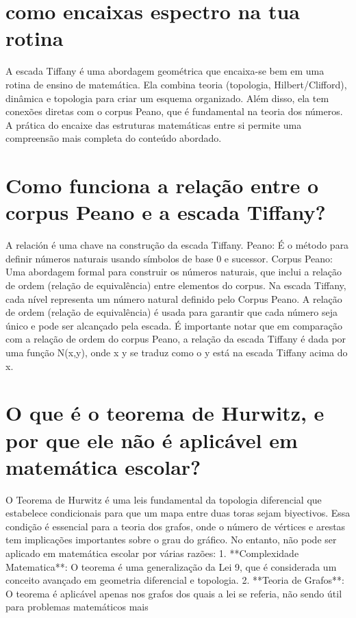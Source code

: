 \documentclass[11pt,a4paper]{article}
\begin{document}
\maketitle
\begin{abstract}Exploração do ollama a partir de sementes banais (nível 2). Teoria continua de fora.\end{abstract}
\section{como encaixas espectro na tua rotina}
A escada Tiffany é uma abordagem geométrica que encaixa-se bem em uma rotina de ensino de matemática. Ela combina teoria (topologia, Hilbert/Clifford), dinâmica e topologia para criar um esquema organizado. Além disso, ela tem conexões diretas com o corpus Peano, que é fundamental na teoria dos números. A prática do encaixe das estruturas matemáticas entre si permite uma compreensão mais completa do conteúdo abordado.

\section{Como funciona a relação entre o corpus Peano e a escada Tiffany?}
A relación é uma chave na construção da escada Tiffany. Peano: É o método para definir números naturais usando símbolos de base 0 e sucessor. Corpus Peano: Uma abordagem formal para construir os números naturais, que inclui a relação de ordem (relação de equivalência) entre elementos do corpus. Na escada Tiffany, cada nível representa um número natural definido pelo Corpus Peano. A relação de ordem (relação de equivalência) é usada para garantir que cada número seja único e pode ser alcançado pela escada. É importante notar que em comparação com a relação de ordem do corpus Peano, a relação da escada Tiffany é dada por uma função N(x,y), onde x y se traduz como o y está na escada Tiffany acima do x.

\section{O que é o teorema de Hurwitz, e por que ele não é aplicável em matemática escolar?}
O Teorema de Hurwitz é uma leis fundamental da topologia diferencial que estabelece condicionais para que um mapa entre duas toras sejam biyectivos. Essa condição é essencial para a teoria dos grafos, onde o número de vértices e arestas tem implicações importantes sobre o grau do gráfico. No entanto, não pode ser aplicado em matemática escolar por várias razões: 1. **Complexidade Matematica**: O teorema é uma generalização da Lei 9, que é considerada um conceito avançado em geometria diferencial e topologia. 2. **Teoria de Grafos**: O teorema é aplicável apenas nos grafos dos quais a lei se referia, não sendo útil para problemas matemáticos mais
\end{document}
